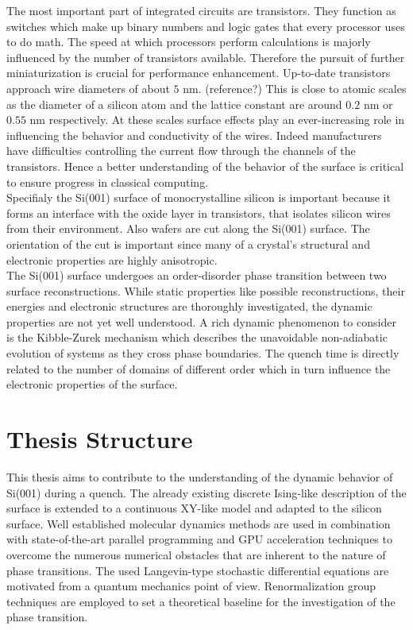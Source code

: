 	The most important part of integrated circuits are transistors. They function as switches which make up binary numbers and logic gates that every processor uses to do math. The speed at which processors perform calculations is majorly influenced by the number of transistors available. Therefore the pursuit of further miniaturization is crucial for performance enhancement. Up-to-date transistors approach wire diameters of about $5\text{ nm}$. (reference?) This is close to atomic scales as the diameter of a silicon atom and the lattice constant are around $0.2\text{ nm}$ or $0.55 \text{ nm}$ respectively. At these scales surface effects play an ever-increasing role in influencing the behavior and conductivity of the wires. Indeed manufacturers have difficulties controlling the current flow through the channels of the transistors. Hence a better understanding of the behavior of the surface is critical to ensure progress in classical computing. \\
	
	Specifialy the Si(001) surface of monocrystalline silicon is important because it forms an interface with the oxide layer in transistors, that isolates silicon wires from their environment. Also wafers are cut along the Si(001) surface. The orientation of the cut is important since many of a crystal's structural and electronic properties are highly anisotropic. \\
	
	The Si(001) surface undergoes an order-disorder phase transition between two surface reconstructions. While static properties like possible reconstructions, their energies and electronic structures are thoroughly investigated, the dynamic properties are not yet well understood. A rich dynamic phenomenon to consider is the Kibble-Zurek mechanism which describes the unavoidable non-adiabatic evolution of systems as they cross phase boundaries. The quench time is directly related to the number of domains of different order which in turn influence the electronic properties of the surface. \\
	
	\section{Thesis Structure}
	This thesis aims to contribute to the understanding of the dynamic behavior of Si(001) during a quench. The already existing discrete Ising-like description of the surface is extended to a continuous XY-like model and adapted to the silicon surface. Well established molecular dynamics methods are used in combination with state-of-the-art parallel programming and GPU acceleration techniques to overcome the numerous numerical obstacles that are inherent to the nature of phase transitions. The used Langevin-type stochastic differential equations are motivated from a quantum mechanics point of view. Renormalization group techniques are employed to set a theoretical baseline for the investigation of the phase transition. \\
	
